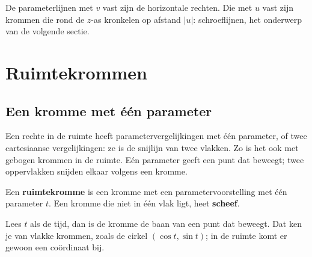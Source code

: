 De parameterlijnen met $v$ vast zijn de horizontale rechten. Die met $u$ vast zijn krommen die rond de $z$-as kronkelen op afstand $|u|$: schroeflijnen, het onderwerp van de volgende sectie.


\section{Ruimtekrommen}

\subsection{Een kromme met één parameter}

Een rechte in de ruimte heeft parametervergelijkingen met één parameter, of twee cartesiaanse vergelijkingen: ze is de snijlijn van twee vlakken. Zo is het ook met gebogen krommen in de ruimte. Eén parameter geeft een punt dat beweegt; twee oppervlakken snijden elkaar volgens een kromme.

\begin{theorie}
Een \textbf{\textcolor{accent}{ruimtekromme}} is een kromme met een parametervoorstelling
met één parameter $t$. Een kromme die niet in één vlak ligt, heet \textbf{\textcolor{accent}{scheef}}.
\end{theorie}

Lees $t$ als de tijd, dan is de kromme de baan van een punt dat beweegt. Dat ken je van vlakke krommen, zoals de cirkel $(\cos t, \sin t)$; in de ruimte komt er gewoon een coördinaat bij.

